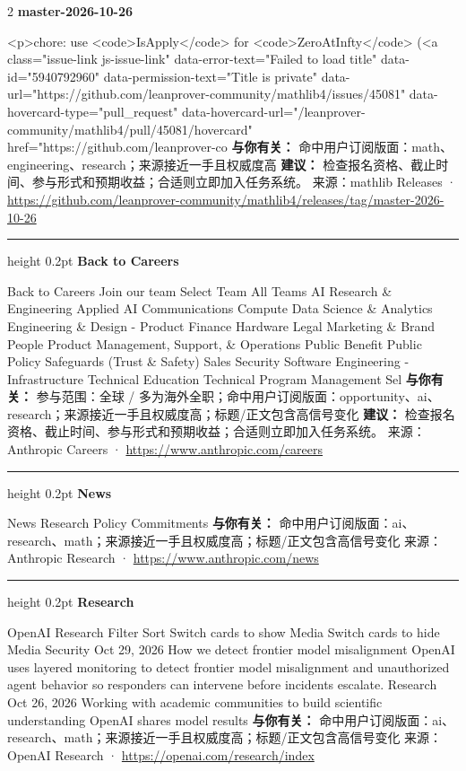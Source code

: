 \documentclass[10.5pt]{ctexart}
\begin{document}
\begin{multicols}{2}
{\large\bfseries master-2026-10-26}\par
<p>chore: use <code>IsApply</code> for <code>ZeroAtInfty</code> (<a class="issue-link js-issue-link" data-error-text="Failed to load title" data-id="5940792960" data-permission-text="Title is private" data-url="https://github.com/leanprover-community/mathlib4/issues/45081" data-hovercard-type="pull\_request" data-hovercard-url="/leanprover-community/mathlib4/pull/45081/hovercard" href="https://github.com/leanprover-co
\textbf{与你有关：} 命中用户订阅版面：math、engineering、research；来源接近一手且权威度高
\textbf{建议：} 检查报名资格、截止时间、参与形式和预期收益；合适则立即加入任务系统。
{\footnotesize\color{ormuted} 来源：mathlib Releases · \url{https://github.com/leanprover-community/mathlib4/releases/tag/master-2026-10-26}}
\vspace{2mm}
\hrule height 0.2pt
\vspace{2mm}
{\large\bfseries Back to Careers}\par
Back to Careers Join our team Select Team All Teams AI Research \& Engineering Applied AI Communications Compute Data Science \& Analytics Engineering \& Design - Product Finance Hardware Legal Marketing \& Brand People Product Management, Support, \& Operations Public Benefit Public Policy Safeguards (Trust \& Safety) Sales Security Software Engineering - Infrastructure Technical Education Technical Program Management Sel
\textbf{与你有关：} 参与范围：全球 / 多为海外全职；命中用户订阅版面：opportunity、ai、research；来源接近一手且权威度高；标题/正文包含高信号变化
\textbf{建议：} 检查报名资格、截止时间、参与形式和预期收益；合适则立即加入任务系统。
{\footnotesize\color{ormuted} 来源：Anthropic Careers · \url{https://www.anthropic.com/careers}}
\vspace{2mm}
\hrule height 0.2pt
\vspace{2mm}
{\large\bfseries News}\par
News Research Policy Commitments
\textbf{与你有关：} 命中用户订阅版面：ai、research、math；来源接近一手且权威度高；标题/正文包含高信号变化
{\footnotesize\color{ormuted} 来源：Anthropic Research · \url{https://www.anthropic.com/news}}
\vspace{2mm}
\hrule height 0.2pt
\vspace{2mm}
{\large\bfseries Research}\par
OpenAI Research Filter Sort Switch cards to show Media Switch cards to hide Media Security Oct 29, 2026 How we detect frontier model misalignment OpenAI uses layered monitoring to detect frontier model misalignment and unauthorized agent behavior so responders can intervene before incidents escalate. Research Oct 26, 2026 Working with academic communities to build scientific understanding OpenAI shares model results 
\textbf{与你有关：} 命中用户订阅版面：ai、research、math；来源接近一手且权威度高；标题/正文包含高信号变化
{\footnotesize\color{ormuted} 来源：OpenAI Research · \url{https://openai.com/research/index}}
\end{multicols}
\end{document}

